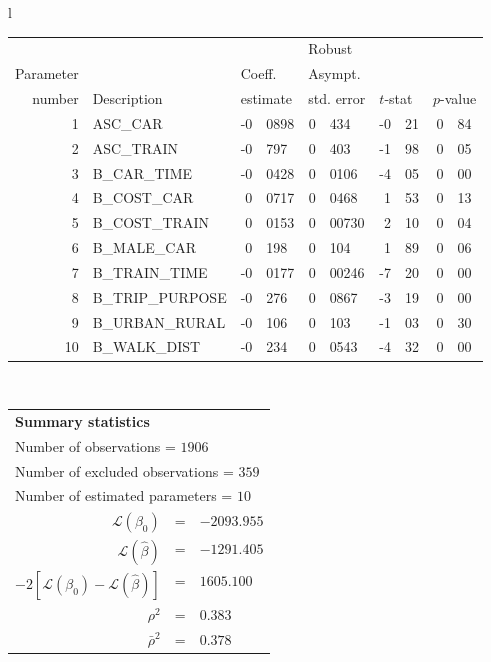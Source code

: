   \begin{tabular}{l}
\begin{tabular}{rlr@{.}lr@{.}lr@{.}lr@{.}l}
         &                       &   \multicolumn{2}{l}{}    & \multicolumn{2}{l}{Robust}  &     \multicolumn{4}{l}{}   \\
Parameter &                       &   \multicolumn{2}{l}{Coeff.}      & \multicolumn{2}{l}{Asympt.}  &     \multicolumn{4}{l}{}   \\
number &  Description                     &   \multicolumn{2}{l}{estimate}      & \multicolumn{2}{l}{std. error}  &   \multicolumn{2}{l}{$t$-stat}  &   \multicolumn{2}{l}{$p$-value}   \\

\hline

1 & ASC_CAR & -0&0898 & 0&434 & -0&21 & 0&84\\
2 & ASC_TRAIN & -0&797 & 0&403 & -1&98 & 0&05\\
3 & B_CAR_TIME & -0&0428 & 0&0106 & -4&05 & 0&00\\
4 & B_COST_CAR & 0&0717 & 0&0468 & 1&53 & 0&13\\
5 & B_COST_TRAIN & 0&0153 & 0&00730 & 2&10 & 0&04\\
6 & B_MALE_CAR & 0&198 & 0&104 & 1&89 & 0&06\\
7 & B_TRAIN_TIME & -0&0177 & 0&00246 & -7&20 & 0&00\\
8 & B_TRIP_PURPOSE & -0&276 & 0&0867 & -3&19 & 0&00\\
9 & B_URBAN_RURAL & -0&106 & 0&103 & -1&03 & 0&30\\
10 & B_WALK_DIST & -0&234 & 0&0543 & -4&32 & 0&00\\
\hline
\end{tabular}
\\
\begin{tabular}{rcl}
\multicolumn{3}{l}{\bf Summary statistics}\\
\multicolumn{3}{l}{ Number of observations = $1906$} \\
\multicolumn{3}{l}{ Number of excluded observations = $359$} \\
\multicolumn{3}{l}{ Number of estimated  parameters = $10$} \\
 $\mathcal{L}(\beta_0)$ &=&  $-2093.955$ \\
 $\mathcal{L}(\hat{\beta})$ &=& $-1291.405 $  \\
 $-2[\mathcal{L}(\beta_0) -\mathcal{L}(\hat{\beta})]$ &=& $1605.100$ \\
    $\rho^2$ &=&   $0.383$ \\
    $\bar{\rho}^2$ &=&    $0.378$ \\
\end{tabular}
  \end{tabular}

